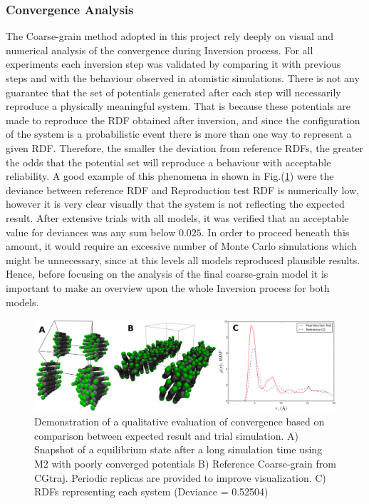 \documentclass[10pt,a4paper,twoside]{article}
\begin{document}
\subsubsection*{Convergence Analysis}
The Coarse-grain method adopted in this project rely deeply on visual and numerical analysis of the convergence during Inversion process. For all experiments each inversion step was validated by comparing it with previous steps and with the behaviour observed in atomistic simulations. There is not any guarantee that the set of potentials generated after each step will necessarily reproduce a physically meaningful system.  That is because these potentials are made to reproduce the RDF obtained after inversion, and since the configuration of the system is a probabilistic event there is more than one way to represent a given RDF. Therefore, the smaller the deviation from reference RDFs, the greater the odds that the potential set will reproduce a behaviour with acceptable reliability. A good example of this phenomena in shown in Fig.(\ref{Fig:wrong}) were the deviance between reference RDF and Reproduction test RDF is numerically low, however it is very clear visually that the system is not reflecting the expected result. After extensive trials  with all models, it was verified that an acceptable value for deviances was any sum below $0.025$. In order to proceed beneath this amount, it would require an excessive number of Monte Carlo simulations which might be unnecessary, since at this levels all models reproduced plausible results. Hence, before focusing on the analysis of the final coarse-grain model it is important to make an overview upon the whole Inversion process for both models.

\begin{figure}[ht!]
  \begin{center}
	\includegraphics[width=1 \textwidth]{./images/wrongM2}
	\caption{Demonstration of a qualitative evaluation of convergence based on comparison between expected result and trial simulation. A) Snapshot of a equilibrium state after a long simulation time using M2 with poorly converged potentials B) Reference Coarse-grain from CGtraj. Periodic replicas are provided to improve visualization. C) RDFs representing each system (Deviance  = 0.52504)}
	\label{Fig:wrong}
  \end{center}
\end{figure}
\end{document}
